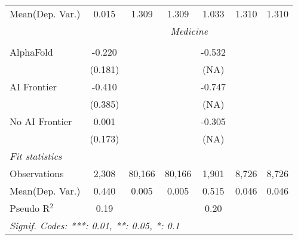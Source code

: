 \begin{tabular}{lcccccc}
Mean(Dep. Var.) & 0.015 & 1.309 & 1.309 & 1.033 & 1.310 & 1.310 \\
 & \multicolumn{6}{c}{\textit{Medicine}} \\ \\
   AlphaFold      & -0.220     &        &        & -0.532    &       &   \\   
                  & (0.181)    &        &        & (NA)      &       &   \\   
   AI Frontier    & -0.410     &        &        & -0.747    &       &   \\   
                  & (0.385)    &        &        & (NA)      &       &   \\   
   No AI Frontier & 0.001      &        &        & -0.305    &       &   \\   
                  & (0.173)    &        &        & (NA)      &       &   \\   
   \midrule
   \emph{Fit statistics}\\
   Observations   & 2,308      & 80,166 & 80,166 & 1,901     & 8,726 & 8,726\\  
Mean(Dep. Var.) & 0.440 & 0.005 & 0.005 & 0.515 & 0.046 & 0.046 \\
   Pseudo R$^2$   & 0.19       &        &        & 0.20      &       & \\  
   \midrule \midrule
   \multicolumn{7}{l}{\emph{Signif. Codes: ***: 0.01, **: 0.05, *: 0.1}}\\
\end{tabular}
\par\endgroup
